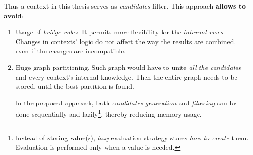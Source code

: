 \documentclass[header]{subfiles}
\begin{document}
Thus a context in this thesis serves as \emph{candidates} filter. This approach
\textbf{allows to avoid}:
\begin{enumerate}
  \item Usage of \emph{bridge rules}. It permits more flexibility for
    the \emph{internal rules}. Changes in contexts' logic do not affect the way
    the results are combined, even if the changes are incompatible.
  \item Huge graph partitioning. Such graph would have to unite \emph{all the
    candidates} and every context's internal knowledge. Then the entire graph
    needs to be stored, until the best partition is found.

    In the proposed approach, both \emph{candidates generation} and
    \emph{filtering} can be done sequentially and
    lazily\footnote{Instead of storing value(s), \emph{lazy} evaluation
                    strategy stores \emph{how to create} them.
                    Evaluation is performed only when a value is needed.},
    thereby reducing memory usage.

\end{enumerate}
\end{document}
